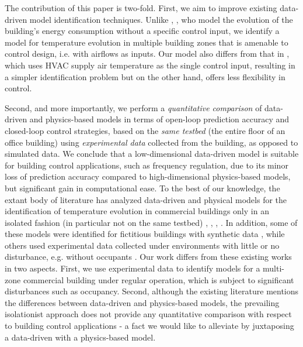 The contribution of this paper is two-fold. First, we aim to improve existing
data-driven model identification techniques. Unlike \cite{Radecki:2012aa}, \cite{Radecki:2013ab}, who model the evolution of the building's energy consumption without a specific control input, we identify a model for temperature evolution in multiple building zones that is amenable to control design, i.e. with airflows as inputs. Our model also differs from that in \cite{Aswani:2012aa}, which uses HVAC supply air temperature as the single control input, resulting in a simpler identification problem but on the other hand, offers less flexibility in control.

Second, and more importantly, we perform a \textit{quantitative comparison} of data-driven and physics-based models in terms of open-loop prediction accuracy and closed-loop control strategies, based on the \textit{same testbed} (the entire floor of an office building) using \textit{experimental data} collected from the building, as opposed to simulated data. %
We conclude that a low-dimensional data-driven model is suitable for building control applications, such as frequency regulation, due to its minor loss of prediction accuracy compared to high-dimensional physics-based models, but significant gain in computational ease. 
To the best of our knowledge, the extant body of literature has analyzed data-driven and physical models for the identification of temperature evolution in commercial buildings only in an isolated fashion (in particular not on the same testbed) \cite{Ma:2011aa}, \cite{Siroky:2011aa}, \cite{Lin:2015exp}, \cite{Qie}. In addition, some of these models were identified for fictitious buildings with synthetic data \cite{Cole:2013aa, Goyal:2013occupancy, David}, while others used experimental data collected under environments with little or no disturbance, e.g. without occupants \cite{Lin:2015exp}. Our work differs from these existing works in two aspects. First, we use experimental data to identify models for a multi-zone commercial building under regular operation, which is subject to significant disturbances such as occupancy. Second, although the existing literature mentions the differences between data-driven and physics-based models, the prevailing isolationist approach does not provide any quantitative comparison with respect to building control applications - a fact we would like to alleviate by juxtaposing a data-driven with a physics-based model.


